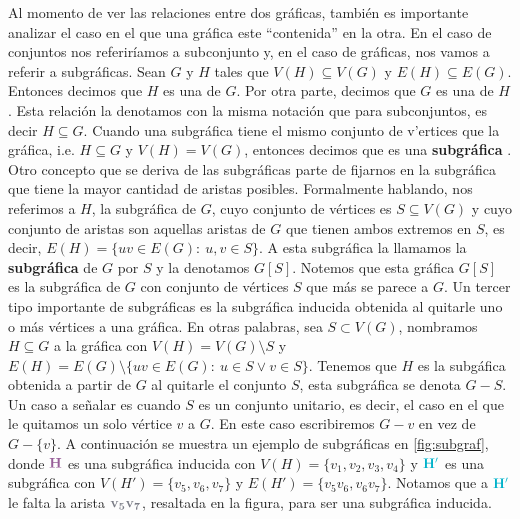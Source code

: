 Al momento de ver las relaciones entre dos gr\'aficas, tambi\'en es importante
analizar el caso en el que una gr\'afica este ``contenida'' en la otra. En el
caso de conjuntos nos referir\'iamos a subconjunto y, en el caso de gr\'aficas,
nos vamos a referir a subgr\'aficas. Sean $G$ y $H$ tales que $V(H) \subseteq
V(G)$ y $E(H) \subseteq E(G)$. Entonces decimos que $H$ es una
 de $G$. Por otra parte, decimos que $G$ es una
 de $H$. Esta relaci\'on la denotamos con la misma
notaci\'on que para subconjuntos, es decir $H \subseteq G$. Cuando una
subgr\'afica tiene el mismo conjunto de v'ertices que la gr\'afica, i.e. $H
\subseteq G$ y $V(H)= V(G)$, entonces decimos que es una \textbf{subgr\'afica}
. Otro concepto que se deriva de las
subgr\'aficas parte de fijarnos en la subgr\'afica que tiene la mayor cantidad
de aristas posibles. Formalmente hablando, nos referimos a $H$, la subgr\'afica
de $G$, cuyo conjunto de v\'ertices es $S \subseteq V(G)$ y cuyo conjunto de
aristas son aquellas aristas de $G$ que tienen ambos extremos en $S$, es decir,
$E(H) = \{uv \in E(G) \colon\ u,v \in S\}$. A esta subgr\'afica la llamamos la
\textbf{subgr\'afica}  de $G$ por $S$ y la
denotamos $G[S]$. Notemos que esta gr\'afica $G[S]$ es la subgr\'afica de $G$
con conjunto de v\'ertices $S$ que m\'as se parece a $G$. Un tercer tipo
importante de subgr\'aficas es la subgr\'afica inducida obtenida al quitarle uno
o m\'as v\'ertices a una gr\'afica. En otras palabras, sea $S \subset V(G)$,
nombramos $H \subseteq G$ a la gr\'afica con $V(H)=V(G) \setminus S$ y $E(H) =
E(G)\setminus\{uv \in E(G) \colon\ u \in S \lor v \in S\}$. Tenemos que $H$ es
la subg\'afica obtenida a partir de $G$ al quitarle el conjunto $S$, esta
subgr\'afica se denota $G-S$. Un caso a se\~{n}alar es cuando $S$ es un conjunto
unitario, es decir, el caso en el que le quitamos un solo v\'ertice $v$ a $G$.
En este caso escribiremos $G-v$ en vez de $G-\{v\}$. A continuaci\'on se muestra
un ejemplo de subgr\'aficas en \cref{fig:subgraf}, donde ${\color{morado}\bf H}$
es una subgr\'afica inducida con $V(H) = \{v_1,v_2,v_3,v_4\}$ y
${\color{azulCielo}\bf H'}$ es una subgr\'afica con $V(H')=\{v_5,v_6,v_7\}$ y
$E(H')=\{v_5v_6,  v_6v_7\}$. Notamos que a ${\color{azulCielo}\bf H'}$ le falta
la arista ${\color{grisOscuro!80}\bf v_5v_7}$, resaltada en la figura, para ser
una subgr\'afica inducida. 

